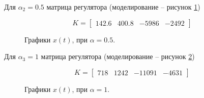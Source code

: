 Для $\alpha_2=0.5$ матрица регулятора (моделирование -- рисунок \ref{4_3_2})

\begin{equation}
    K = \begin{bmatrix}
        142.6 & 400.8 & -5986 & -2492
    \end{bmatrix}
\end{equation}

\begin{figure}[!h]
\caption{Графики $x(t)$, при $\alpha = 0.5$.}
\label{4_3_2}
\end{figure}


Для $\alpha_3=1$ матрица регулятора (моделирование -- рисунок \ref{4_3_3})

\begin{equation}
    K = \begin{bmatrix}
        718& 1242 & -11091 & -4631
    \end{bmatrix}
\end{equation}

\begin{figure}[!h]
\caption{Графики $x(t)$, при $\alpha = 1$.}
\label{4_3_3}
\end{figure}


